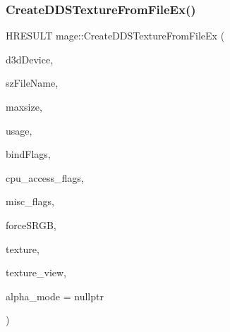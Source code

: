 \hypertarget{namespacemage_a9045c198b22d96e6225961f391cb4e04}{}\label{namespacemage_a9045c198b22d96e6225961f391cb4e04} 
\subsubsection{\texorpdfstring{Create\+D\+D\+S\+Texture\+From\+File\+Ex()}{CreateDDSTextureFromFileEx()}\hspace{0.1cm}{\footnotesize\ttfamily [1/4]}}
{\footnotesize\ttfamily H\+R\+E\+S\+U\+LT mage\+::\+Create\+D\+D\+S\+Texture\+From\+File\+Ex (\begin{DoxyParamCaption}\item[{\+\_\+\+In\+\_\+ I\+D3\+D11\+Device $\ast$}]{d3d\+Device,  }\item[{\+\_\+\+In\+\_\+z\+\_\+ const wchar\+\_\+t $\ast$}]{sz\+File\+Name,  }\item[{\+\_\+\+In\+\_\+ size\+\_\+t}]{maxsize,  }\item[{\+\_\+\+In\+\_\+ D3\+D11\+\_\+\+U\+S\+A\+GE}]{usage,  }\item[{\+\_\+\+In\+\_\+ uint32\+\_\+t}]{bind\+Flags,  }\item[{\+\_\+\+In\+\_\+ uint32\+\_\+t}]{cpu\+\_\+access\+\_\+flags,  }\item[{\+\_\+\+In\+\_\+ uint32\+\_\+t}]{misc\+\_\+flags,  }\item[{\+\_\+\+In\+\_\+ bool}]{force\+S\+R\+GB,  }\item[{\+\_\+\+Outptr\+\_\+opt\+\_\+ I\+D3\+D11\+Resource $\ast$$\ast$}]{texture,  }\item[{\+\_\+\+Outptr\+\_\+opt\+\_\+ I\+D3\+D11\+Shader\+Resource\+View $\ast$$\ast$}]{texture\+\_\+view,  }\item[{\+\_\+\+Out\+\_\+opt\+\_\+ \hyperlink{namespacemage_a0c586a2bad862f4858900ca121ca80c2}{D\+D\+S\+\_\+\+A\+L\+P\+H\+A\+\_\+\+M\+O\+DE} $\ast$}]{alpha\+\_\+mode = {\ttfamily nullptr} }\end{DoxyParamCaption})}

\hypertarget{namespacemage_a631c86abbb86a2c2cdfd04bd8a08f2b7}{}\label{namespacemage_a631c86abbb86a2c2cdfd04bd8a08f2b7} 
